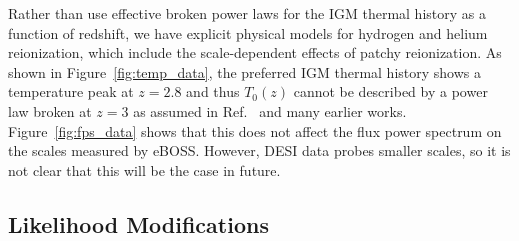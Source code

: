 Rather than use effective broken power laws for the IGM thermal history as a function of redshift, we have explicit physical models for hydrogen and helium reionization, which include the scale-dependent effects of patchy reionization.
As shown in Figure~\ref{fig:temp_data}, the preferred IGM thermal history shows a temperature peak at $z=2.8$ and thus $T_0(z)$ cannot be described by a power law broken at $z=3$ as assumed in Ref.~\cite{2020JCAP...04..038P} and many earlier works.
Figure~\ref{fig:fps_data} shows that this does not affect the flux power spectrum on the scales measured by eBOSS.
However, DESI data probes smaller scales, so it is not clear that this will be the case in future. 





\subsection{Likelihood Modifications}
\label{sec:altlikelihood}

